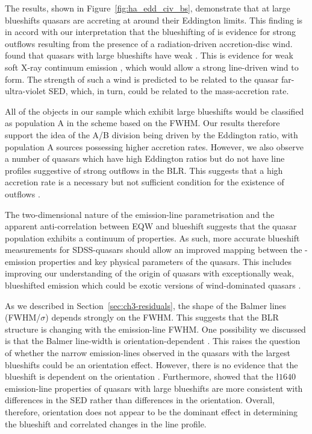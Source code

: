 The results, shown in Figure~\ref{fig:ha_edd_civ_bs}, demonstrate that at large blueshifts quasars are accreting at around their Eddington limits. 
This finding is in accord with our interpretation that the blueshifting of  is evidence for strong outflows resulting from the presence of a radiation-driven accretion-disc wind. 
\citet{richards02} found that quasars with large  blueshifts have weak .
This is evidence for weak soft X-ray continuum emission \citep{leighly04}, which would allow a strong line-driven wind to form.  
The strength of such a wind is predicted to be related to the quasar far-ultra-violet SED, which, in turn, could be related to the mass-accretion rate.

All of the objects in our sample which exhibit large  blueshifts would be classified as population A in the \citet{sulentic00b} scheme based on the \ha FWHM. 
Our results therefore support the idea of the \citet{sulentic00b} A/B division being driven by the Eddington ratio, with population A sources possessing higher accretion rates.
However, we also observe a number of quasars which have high Eddington ratios but do not have line profiles suggestive of strong outflows in the  BLR.  
This suggests that a high accretion rate is a necessary but not sufficient condition for the existence of outflows \citep{baskin05}. 

The two-dimensional nature of the  emission-line parametrisation and the apparent anti-correlation between  EQW and  blueshift suggests that the quasar population exhibits a continuum of properties. 
As such, more accurate  blueshift measurements for SDSS-quasars should allow an improved mapping between the -emission properties and key physical parameters of the quasars.
This includes improving our understanding of the origin of quasars with exceptionally weak, blueshifted  emission \citep[weak emission-line quasars;][]{luo15} which could be exotic versions of wind-dominated quasars \citep{plotkin15}.

As we described in Section~\ref{sec:ch3-residuals}, the shape of the Balmer lines (FWHM/$\sigma$) depends strongly on the FWHM. 
This suggests that the BLR structure is changing with the emission-line FWHM. 
One possibility we discussed is that the Balmer line-width is orientation-dependent \citep[e.g.][]{shen14}. 
This raises the question of whether the narrow \ha emission-lines observed in the quasars with the largest  blueshifts could be an orientation effect. 
However, there is no evidence that the  blueshift is dependent on the orientation \citep[inferred from the radio core-dominance;][]{richards11,runnoe14}. 
Furthermore, \citet{leighly04} showed that the \l$1640$ emission-line properties of quasars with large  blueshifts are more consistent with differences in the SED rather than differences in the orientation.
Overall, therefore, orientation does not appear to be the dominant effect in determining the  blueshift and correlated changes in the \ha line profile.

